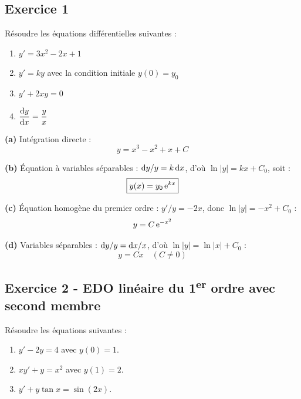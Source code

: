 \documentclass[12pt,a4paper]{article}
\begin{document}
\subsection*{Exercice 1 \niveau{\facile}}

\begin{boiteexercice}
Résoudre les équations différentielles suivantes :
\begin{enumerate}[label=(\alph*)]
  \item $y' = 3x^2 - 2x + 1$
  \item $y' = ky$ avec la condition initiale $y(0) = y_0$
  \item $y' + 2xy = 0$
  \item $\dfrac{\mathrm{d} y}{\mathrm{d} x} = \dfrac{y}{x}$
\end{enumerate}
\end{boiteexercice}

\begin{boitecorrige}
\textbf{(a)} Intégration directe :
\[
y = x^3 - x^2 + x + C
\]

\textbf{(b)} Équation à variables séparables : $\mathrm{d} y/y = k\,\mathrm{d} x$, d'où $\ln|y| = kx + C_0$, soit :
\[
\boxed{y(x) = y_0\,\mathrm{e}^{kx}}
\]

\textbf{(c)} Équation homogène du premier ordre : $y'/y = -2x$, donc $\ln|y| = -x^2 + C_0$ :
\[
y = C\,\mathrm{e}^{-x^2}
\]

\textbf{(d)} Variables séparables : $\mathrm{d} y/y = \mathrm{d} x/x$, d'où $\ln|y| = \ln|x| + C_0$ :
\[
y = Cx \quad (C \neq 0)
\]
\end{boitecorrige}

\subsection*{Exercice 2 - EDO linéaire du 1\textsuperscript{er} ordre avec second membre \niveau{\moyen}}

\begin{boiteexercice}
Résoudre les équations suivantes :
\begin{enumerate}[label=(\alph*)]
  \item $y' - 2y = 4$ avec $y(0) = 1$.
  \item $xy' + y = x^2$ avec $y(1) = 2$.
  \item $y' + y\tan x = \sin(2x)$.
\end{enumerate}
\end{boiteexercice}
\end{document}

